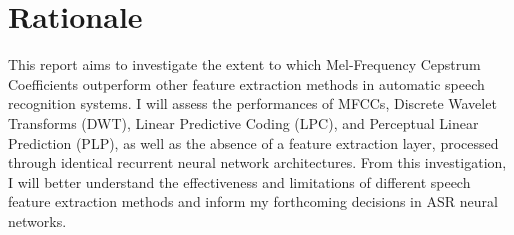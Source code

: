 \section{Rationale}

This report aims to investigate the extent to which Mel-Frequency Cepstrum Coefficients outperform other feature extraction methods in automatic speech recognition systems. I will assess the performances of MFCCs, Discrete Wavelet Transforms (DWT), Linear Predictive Coding (LPC), and Perceptual Linear Prediction (PLP), as well as the absence of a feature extraction layer, processed through identical recurrent neural network architectures. From this investigation, I will better understand the effectiveness and limitations of different speech feature extraction methods and inform my forthcoming decisions in ASR neural networks.